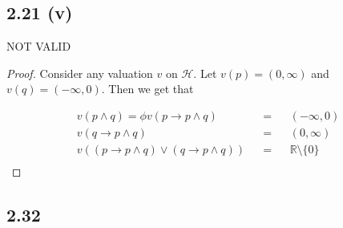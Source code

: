 \documentclass[12pt]{article}
\begin{document}
\subsection*{2.21 (v)} NOT VALID
\begin{proof}
Consider any valuation $v$ on $\mathcal{H}$. Let $v(p) = (0, \infty)$ and $v(q) = (-\infty, 0)$. Then we get that

\begin{align*}
    v(p \wedge q) = \phi
    v(p \rightarrow p \wedge q) && = && (-\infty, 0) \\
    v(q \rightarrow p \wedge q) && = && (0, \infty) \\
    v((p \rightarrow p \wedge q) \vee (q \rightarrow p \wedge q)) && = && \mathbb{R} \setminus \{0\} \\
\end{align*}
\end{proof}

\subsection*{2.32}
\end{document}
